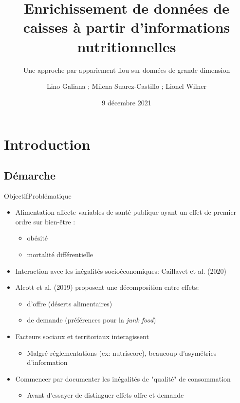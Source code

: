 \documentclass[ignorenonframetext,]{beamer}
\title{Enrichissement de données de caisses à partir d’informations nutritionnelles}
\subtitle{Une approche par appariement flou sur données de grande dimension}
\author[shortname]{Lino Galiana\inst{1} ; Milena Suarez-Castillo\inst{2} ; Lionel Wilner\inst{1}}
\institute[shortinst]{\inst{1} D2E  \inst{2} SSP-lab}
\date{9 décembre 2021}
\begin{document}
\frame{\titlepage}

\begin{frame}
\tableofcontents[hideallsubsections]
\end{frame}

\section{Introduction}\label{sec: introduction}

\subsection{Démarche}

\begin{frame}{Objectif}{Problématique}

\begin{itemize}
    \item Alimentation affecte variables de santé publique ayant un effet de premier ordre sur bien-être :
\begin{itemize}
\item obésité
\item mortalité différentielle
\end{itemize}
\item Interaction avec les inégalités socioéconomiques: Caillavet et al. (2020)
\item Alcott et al. (2019) proposent une décomposition entre effets:
\begin{itemize}
\item d'offre (déserts alimentaires)
\item de demande (préférences pour la \textit{junk food})
\end{itemize}
\item Facteurs sociaux et territoriaux interagissent
\begin{itemize}
\item Malgré réglementations (ex: nutriscore), beaucoup d'asymétries d'information
\end{itemize}
\item Commencer par documenter les inégalités de "qualité" de consommation
\begin{itemize}
\item Avant d'essayer de distinguer effets offre et demande
\end{itemize}
\end{itemize}
    
\end{frame}
\end{document}
